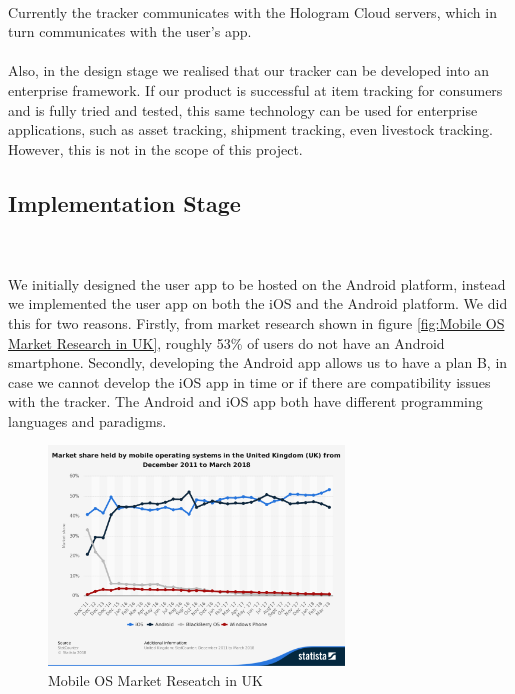 \documentclass[12pt,a4paper]{article}
\begin{document}
        \paragraph{} Currently the tracker communicates with the Hologram Cloud servers, which in turn communicates with the user’s app.
        
        \paragraph{} Also, in the design stage we realised that our tracker can be developed into an enterprise framework. If our product is successful at item tracking for consumers and is fully tried and tested, this same technology can be used for enterprise applications, such as asset tracking, shipment tracking, even livestock tracking. However, this is not in the scope of this project.
        
      \subsection{Implementation Stage}

        \paragraph{} We initially designed the user app to be hosted on the Android platform, instead we implemented the user app on both the iOS and the Android platform. We did this for two reasons. Firstly, from market research shown in figure \ref{fig:Mobile OS Market Research in UK}, roughly 53\% of users do not have an Android smartphone. Secondly, developing the Android app allows us to have a plan B, in case we cannot develop the iOS app in time or if there are compatibility issues with the tracker. The Android and iOS app both have different programming languages and paradigms. 

        \begin{figure}[H]
          \centering
          \includegraphics[width=0.7\textwidth]{../assets/design-implement-stage-market-research.png}
          \caption{Mobile OS Market Reseatch in UK \cite{MobileOSMarketShare}}
          \label{fig:Mobile OS Market Reseatch in UK}
        \end{figure}
        
\end{document}
